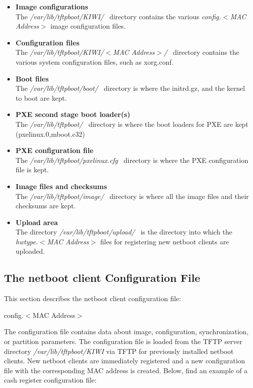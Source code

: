 \begin{itemize}
\item \textbf{Image configurations}\\
      The \textit{/var/lib/tftpboot/KIWI/}~ directory contains the various
      \textit{config.$<$MAC Address$>$} image configuration files.
\item \textbf{Configuration files}\\
      The \textit{/var/lib/tftpboot/KIWI/$<$MAC Address$>$/}~ directory
      contains the various system configuration files, such as xorg.conf.
\item \textbf{Boot files}\\
      The \textit{/var/lib/tftpboot/boot/}~ directory is where the initrd.gz,
      and the kernel to boot are kept.
\item \textbf{PXE second stage boot loader(s)}\\
      The \textit{/var/lib/tftpboot/}~ directory is where the boot loaders
      for PXE are kept (pxelinux.0,mboot.c32)
\item \textbf{PXE configuration file}\\
      The \textit{/var/lib/tftpboot/pxelinux.cfg}~ directory is where
      the PXE configuration file is kept.
\item \textbf{Image files and checksums}\\
      The \textit{/var/lib/tftpboot/image/}~ directory is where all the image
      files and their checksums are kept.
\item \textbf{Upload area}\\
      The directory \textit{/var/lib/tftpboot/upload/}~ is the directory into
      which the \textit{hwtype.$<$MAC Address$>$} files for registering
      new netboot clients are uploaded.
\end{itemize}


\subsection{The netboot client Configuration File}
\label{section:confmac}
This section describes the netboot client configuration file:

\begin{Command}{8cm}
	config.$<$MAC Address$>$
\end{Command}

The configuration file contains data about image, configuration,
synchronization, or partition parameters. The configuration file is
loaded from the TFTP server directory \textit{/var/lib/tftpboot/KIWI} via TFTP
for previously installed netboot clients. New netboot clients are
immediately registered and a new configuration file with the
corresponding MAC address is created. Below, find an example of a cash
register configuration file:


